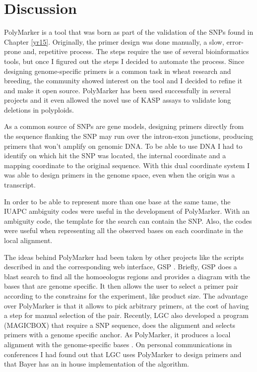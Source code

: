 

\section{Discussion}

PolyMarker is a tool that was born as part of the validation of the SNPs found in Chapter \ref{yr15}. 
Originally, the primer design was done manually, a slow, error-prone and, repetitive process. 
The steps require the use of several bioinformatics tools, but once I figured out the steps I decided to automate the process. 
Since designing genome-specific primers is a common task in wheat research and breeding, the community showed interest on the tool and I decided to refine it and make it open source. 
PolyMarker has been used successfully in several projects and it even allowed the novel use of KASP assays to validate long deletions in polyploids. 
 
As a common source of SNPs are gene models, designing primers directly from the sequence flanking the SNP may run over the intron-exon junctions, producing primers that won't amplify on genomic DNA. 
To be able to use DNA I had to identify on which hit the SNP was located, the internal coordinate and a mapping coordinate to the original sequence. 
With this dual coordinate system I was able to design primers in the genome space, even when the origin was a transcript. 

In order to be able to represent more than one base at the same tame, the IUAPC ambiguity codes \citep{Cornish-Bowden1985} were useful in the development of PolyMarker. 
With an ambiguity code, the template for the search can contain the SNP. 
Also, the codes were useful when representing all the observed bases on each coordinate in the local alignment. 

The ideas behind PolyMarker had been taken by other projects like the scripts described in \cite{Ma2015} and the corresponding web interface, GSP \citep{Wang2016}. 
Briefly, GSP does a blast search to find all the homoeologus regions and provides a diagram with the bases that are genome specific. 
It then allows the user to select a primer pair according to the constrains for the experiment, like product size. 
The advantage over PolyMarker is that it allows to pick arbitrary primers, at the cost of having a step for manual selection of the pair. 
Recently, LGC also developed a program (MAGICBOX) that require a SNP sequence, does the alignment and selects primers with a genome specific anchor. 
As PolyMarker, it produces a local alignment with the genome-specific bases \citep{Curry2016}. 
On personal communications in conferences I had found out that LGC uses PolyMarker to design primers and that Bayer has an in house implementation of the algorithm. 

